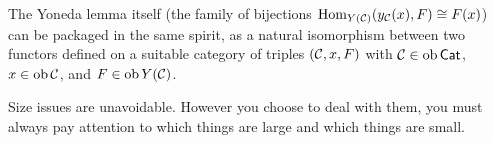 The Yoneda lemma itself (the family of bijections $\operatorname{Hom}_{Y(\mathcal{C})}(y_{\mathcal{C}}(x), F) \cong F(x)$) can be packaged in the same spirit, as a natural isomorphism between two functors defined on a suitable category of triples $(\mathcal{C}, x, F)$ with $\mathcal{C} \in \operatorname{ob} \mathsf{Cat}$, $x \in \operatorname{ob} \mathcal{C}$, and $F \in \operatorname{ob} Y(\mathcal{C})$.

\begin{slogan}\label{slogan:size issues are unavoidable}
    Size issues are unavoidable. However you choose to deal with them, you must always pay attention to which things are large and which things are small.
\end{slogan}
